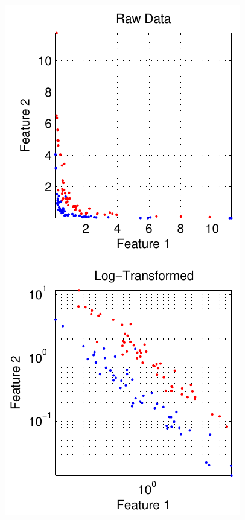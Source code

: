 \documentclass{beamer}
\begin{document}
\begin{frame}
\begin{columns}[c]
\includegraphics[width=\textwidth]{log_transformed}
\end{columns}
\end{frame}
\end{document}
